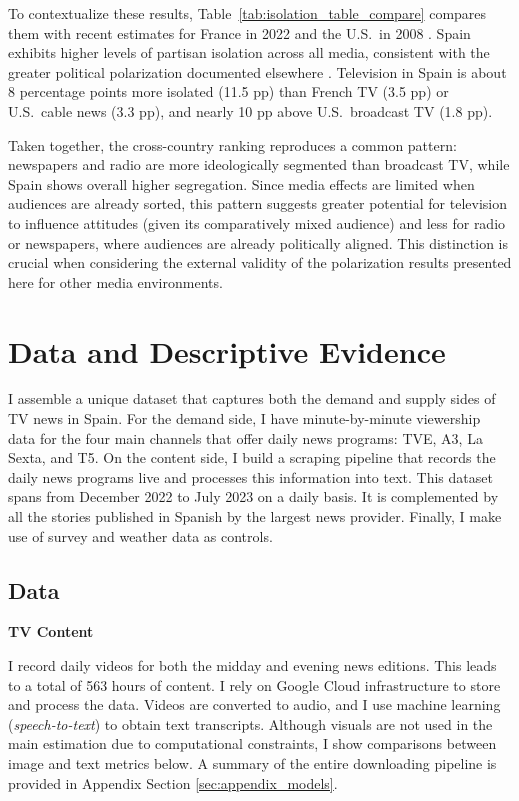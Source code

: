\documentclass[12pt]{article}
\begin{document}
	To contextualize these results, Table~\ref{tab:isolation_table_compare} compares them with recent estimates for France in 2022 \citep{Dejean2022PartisanSE} and the U.S.\ in 2008 \citep{gentzkow_isolation}. Spain exhibits higher levels of partisan isolation across all media, consistent with the greater political polarization documented elsewhere \citep{edelman_trust_2023}.
	Television in Spain is about 8 percentage points more isolated (11.5 pp) than French TV (3.5 pp) or U.S.\ cable news (3.3 pp), and nearly 10 pp above U.S.\ broadcast TV (1.8 pp).
	
	Taken together, the cross-country ranking reproduces a common pattern: newspapers and radio are more ideologically segmented than broadcast TV, while Spain shows overall higher segregation. Since media effects are limited when audiences are already sorted, this pattern suggests greater potential for television to influence attitudes (given its comparatively mixed audience) and less for radio or newspapers, where audiences are already politically aligned. This distinction is crucial when considering the external validity of the polarization results presented here for other media environments.
	
	
	
	
	
	
	
	
	\section{Data and Descriptive Evidence}
	\label{sec:data}

	I assemble a unique dataset that captures both the demand and supply sides of TV news in Spain. For the demand side, I have minute-by-minute viewership data for the four main channels that offer daily news programs: TVE, A3, La Sexta, and T5. On the content side, I build a scraping pipeline that records the daily news programs live and processes this information into text. This dataset spans from December 2022 to July 2023 on a daily basis. It is complemented by all the stories published in Spanish by the largest news provider. Finally, I make use of survey and weather data as controls.
	
		\subsection{Data}
		
			\textbf{TV Content}
		
		I record daily  videos for both the midday and evening news editions. This leads to a total of 563 hours of content. I rely on Google Cloud infrastructure to store and process the data. Videos are converted to audio, and I use machine learning (\textit{speech-to-text}) to obtain text transcripts. Although visuals are not used in the main estimation due to computational constraints, I show comparisons between image and text metrics below. A summary of the entire downloading pipeline is provided in Appendix Section \ref{sec:appendix_models}.
		
\end{document}
